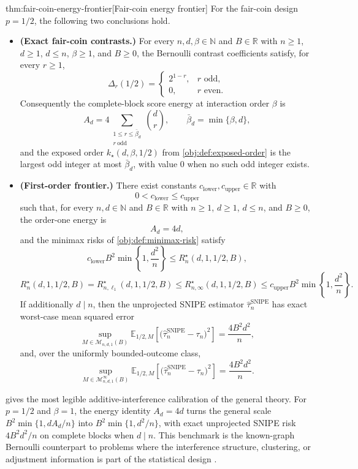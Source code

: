 \documentclass[11pt]{article}
\begin{document}
\begin{theoremv}{thm:fair-coin-energy-frontier}[Fair-coin energy frontier]
For the fair-coin design \(p=1/2\), the following two conclusions hold.

\begin{itemize}
\item \textbf{(Exact fair-coin contrasts.)} For every \(n,d,\beta\in\mathbb N\) and \(B\in\mathbb R\) with \(n\ge 1\), \(d\ge 1\), \(d\le n\), \(\beta\ge 1\), and \(B\ge 0\), the Bernoulli contrast coefficients satisfy, for every \(r\ge 1\),
\[
\Delta_r(1/2)
=
\begin{cases}
2^{1-r}, & r \text{ odd},\\
0, & r \text{ even}.
\end{cases}
\]
Consequently the complete-block score energy at interaction order \(\beta\) is
\[
A_d
=
4\sum_{\substack{1\le r\le \bar\beta_d\\ r\ \mathrm{odd}}}\binom dr,
\qquad
\bar\beta_d=\min\{\beta,d\},
\]
and the exposed order \(k_\star(d,\beta,1/2)\) from \cref{obj:def:exposed-order} is the largest odd integer at most \(\bar\beta_d\), with value \(0\) when no such odd integer exists.

\item \textbf{(First-order frontier.)} There exist constants \(c_{\mathrm{lower}},c_{\mathrm{upper}}\in\mathbb R\) with
\[
0<c_{\mathrm{lower}}\le c_{\mathrm{upper}}
\]
such that, for every \(n,d\in\mathbb N\) and \(B\in\mathbb R\) with \(n\ge 1\), \(d\ge 1\), \(d\le n\), and \(B\ge 0\), the order-one energy is
\[
A_d=4d,
\]
and the minimax risks of \cref{obj:def:minimax-risk} satisfy
\[
c_{\mathrm{lower}}B^2\min\!\left\{1,\frac{d^2}{n}\right\}
\le
R_n^\star(d,1,1/2,B),
\]
\[
R_n^\star(d,1,1/2,B)
=
R_{n,\ell_1}^\star(d,1,1/2,B)
\le
R_{n,\infty}^\star(d,1,1/2,B)
\le
c_{\mathrm{upper}}B^2\min\!\left\{1,\frac{d^2}{n}\right\}.
\]
If additionally \(d\mid n\), then the unprojected SNIPE estimator \(\widehat\tau_n^{\mathrm{SNIPE}}\) has exact worst-case mean squared error
\[
\sup_{M\in\mathcal M_{n,d,1}(B)}
\mathbb E_{1/2,M}\!\left[
\bigl(\widehat\tau_n^{\mathrm{SNIPE}}-\tau_n\bigr)^2
\right]
=
\frac{4B^2d^2}{n},
\]
and, over the uniformly bounded-outcome class,
\[
\sup_{M\in\mathcal M_{n,d,1}^{\infty}(B)}
\mathbb E_{1/2,M}\!\left[
\bigl(\widehat\tau_n^{\mathrm{SNIPE}}-\tau_n\bigr)^2
\right]
=
\frac{4B^2d^2}{n}.
\]
\end{itemize}
\end{theoremv}

 gives the most legible additive-interference calibration of the general theory. For \(p=1/2\) and \(\beta=1\), the energy identity \(A_d=4d\) turns the general scale \(B^2\min\{1,dA_d/n\}\) into \(B^2\min\{1,d^2/n\}\), with exact unprojected SNIPE risk \(4B^2d^2/n\) on complete blocks when \(d\mid n\). This benchmark is the known-graph Bernoulli counterpart to problems where the interference structure, clustering, or adjustment information is part of the statistical design \citep{YuAiroldiBorgsChayes2022,EichhornKhanUganderYu2026,WangLi2026}.
\end{document}
